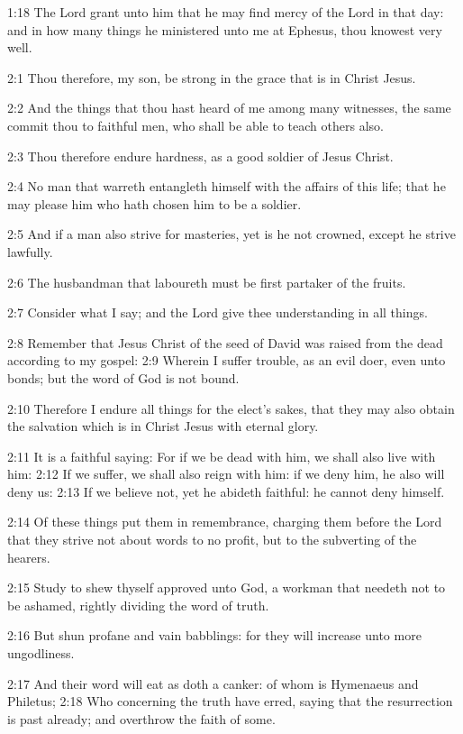1:18 The Lord grant unto him that he may find mercy of the Lord in
that day: and in how many things he ministered unto me at Ephesus,
thou knowest very well.

2:1 Thou therefore, my son, be strong in the grace that is in Christ
Jesus.

2:2 And the things that thou hast heard of me among many witnesses,
the same commit thou to faithful men, who shall be able to teach
others also.

2:3 Thou therefore endure hardness, as a good soldier of Jesus Christ.

2:4 No man that warreth entangleth himself with the affairs of this
life; that he may please him who hath chosen him to be a soldier.

2:5 And if a man also strive for masteries, yet is he not crowned,
except he strive lawfully.

2:6 The husbandman that laboureth must be first partaker of the
fruits.

2:7 Consider what I say; and the Lord give thee understanding in all
things.

2:8 Remember that Jesus Christ of the seed of David was raised from
the dead according to my gospel: 2:9 Wherein I suffer trouble, as an
evil doer, even unto bonds; but the word of God is not bound.

2:10 Therefore I endure all things for the elect's sakes, that they
may also obtain the salvation which is in Christ Jesus with eternal
glory.

2:11 It is a faithful saying: For if we be dead with him, we shall
also live with him: 2:12 If we suffer, we shall also reign with him:
if we deny him, he also will deny us: 2:13 If we believe not, yet he
abideth faithful: he cannot deny himself.

2:14 Of these things put them in remembrance, charging them before the
Lord that they strive not about words to no profit, but to the
subverting of the hearers.

2:15 Study to shew thyself approved unto God, a workman that needeth
not to be ashamed, rightly dividing the word of truth.

2:16 But shun profane and vain babblings: for they will increase unto
more ungodliness.

2:17 And their word will eat as doth a canker: of whom is Hymenaeus
and Philetus; 2:18 Who concerning the truth have erred, saying that
the resurrection is past already; and overthrow the faith of some.

